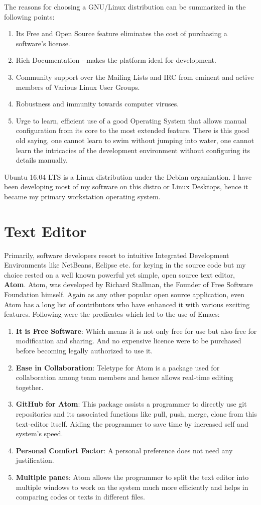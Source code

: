 The reasons for choosing a GNU/Linux distribution can be summarized in the following points:
\begin{enumerate}
  \item Its Free and Open Source feature eliminates the cost of purchasing a software's license.
  \item Rich Documentation - makes the platform ideal for development.
  \item Community support over the Mailing Lists and IRC from eminent and active members of Various Linux User Groups.
  \item Robustness and immunity towards computer viruses.
  \item Urge to learn, efficient use of a good Operating System that allows manual configuration from its core to the most extended feature. There is this good old saying, one cannot learn to swim without jumping into water, one cannot learn the intricacies of the development environment without configuring its details manually. 
\end{enumerate}
Ubuntu 16.04 LTS is a Linux distribution under the Debian organization. I have been developing most of my software on this distro or Linux Desktops, hence it became my primary workstation operating system. 

\section {Text Editor}
Primarily, software developers resort to intuitive Integrated Development Environments like NetBeans, Eclipse etc. for keying in the source code but my choice rested on a well known powerful yet simple, open source text editor, \textbf{Atom}. Atom, was developed by Richard Stallman, the Founder of Free Software Foundation himself. Again as any other popular open source application, even Atom has a long list of contributors who have enhanced it with various exciting features. Following were the predicates which led to the use of Emacs:
\begin{enumerate}
  \item \textbf{It is Free Software}: Which means it is not only free for use but also free for modification and sharing. And no expensive licence were to be purchased before becoming legally authorized to use it.
  \item \textbf{Ease in Collaboration}: Teletype for Atom is a package used for collaboration among team members and hence allows real-time editing together.
  \item \textbf{GitHub for Atom}: This package assists a programmer to directly use git repositories and its associated functions like pull, push, merge, clone from this text-editor  itself. Aiding the programmer to save time by increased self and system's speed.
  \item \textbf{Personal Comfort Factor}: A personal preference does not need any justification.
  \item \textbf{Multiple panes}: Atom allows the programmer to split the text editor into multiple windows to work on the system much more efficiently and helps in comparing codes or texts in different files.
\end{enumerate}

